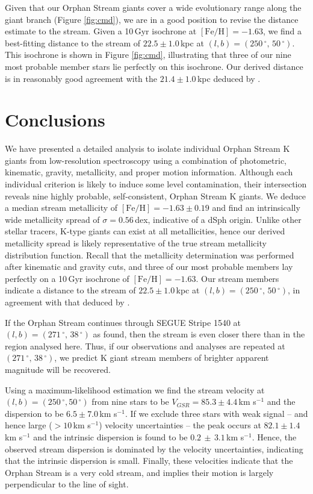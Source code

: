 \documentclass{emulateapj}
\begin{document}
Given that our Orphan Stream giants cover a wide evolutionary range along the giant branch (Figure \ref{fig:cmd}), we are in a good position to revise the distance estimate to the stream. Given a 10\,Gyr \citet{Girardi;et-al_2008} isochrone at $[\mbox{Fe/H}] = -1.63$, we find a best-fitting distance to the stream of $22.5 \pm 1.0$\,kpc at $(l, b) = (250\,^\circ,\,50\,^\circ)$. This isochrone is shown in Figure \ref{fig:cmd}, illustrating that three of our nine most probable member stars lie perfectly on this isochrone. Our derived distance is in reasonably good agreement with the $21.4 \pm 1.0$\,kpc deduced by \citet{Newberg;et-al_2010}.


\section{Conclusions}
\label{sec:conclusions}

We have presented a detailed analysis to isolate individual Orphan Stream K giants from low-resolution spectroscopy using a combination of photometric, kinematic, gravity, metallicity, and proper motion information. Although each individual criterion is likely to induce some level contamination, their intersection reveals nine highly probable, self-consistent, Orphan Stream K giants.  We deduce a median stream metallicity of $[\mbox{Fe/H}] = -1.63 \pm 0.19$ and find an intrinsically wide metallicity spread of $\sigma = 0.56$\,dex, indicative of a dSph origin. Unlike other stellar tracers, K-type giants can exist at all metallicities, hence our derived metallicity spread is likely representative of the true stream metallicity distribution function. Recall that the metallicity determination was performed after kinematic and gravity cuts, and three of our most probable members lay perfectly on a 10\,Gyr isochrone of $[\mbox{Fe/H}] = -1.63$. Our stream members indicate a distance to the stream of $22.5 \pm 1.0$\,kpc at $(l, b) = (250\,^\circ,\,50\,^\circ)$, in agreement with that deduced by \citet{Newberg;et-al_2010}.

If the Orphan Stream continues through SEGUE Stripe 1540 at $(l, b) = (271\,^\circ,\,38\,^\circ)$ as \citet{Newberg;et-al_2010} found, then the stream is even closer there than in the region analysed here. Thus, if our observations and analyses are repeated at $(271\,^\circ,\,38\,^\circ)$, we predict K giant stream members of brighter apparent magnitude will be recovered.

Using a maximum-likelihood estimation we find the stream velocity at $(l, b) = (250\,^\circ, 50\,^\circ)$ from nine stars to be $V_{GSR} = 85.3 \pm 4.4$\,km s$^{-1}$ and the dispersion to be $6.5 \pm 7.0$\,km s$^{-1}$. If we exclude three stars with weak signal \--- and hence large ($> 10$\,km s$^{-1}$) velocity uncertainties \--- the peak occurs at $82.1 \pm 1.4$\,km s$^{-1}$ and the intrinsic dispersion is found to be $0.2\,\pm\,3.1$\,km s$^{-1}$. Hence, the observed stream dispersion is dominated by the velocity uncertainties, indicating that the intrinsic dispersion is small. Finally, these velocities indicate that the Orphan Stream is a very cold stream, and implies their motion is largely perpendicular to the line of sight.
\end{document}
